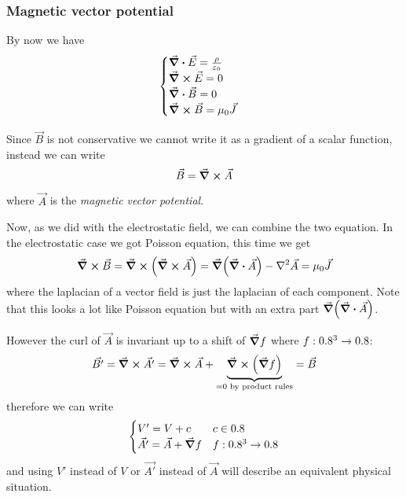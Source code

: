 \documentclass[12pt]{extarticle}
\begin{document}
\subsubsection{Magnetic vector potential}

By now we have
\begin{equation}
	\begin{cases}
		\div \vec E = \frac{\rho}{\varepsilon_0} \\
		\curl \vec E = 0                         \\
		\div \vec B = 0                          \\
		\curl \vec B = \mu_0 \vec J
	\end{cases}
\end{equation}

Since $\vec B$ is not conservative we cannot write it as a gradient of a scalar function,
instead we can write
\begin{equation}
	\vec B = \curl \vec A
\end{equation}
where $\vec A$ is the \emph{magnetic vector potential}.

Now, as we did with the electrostatic field, we can combine the two equation.
In the electrostatic case we got Poisson equation, this time we get
\begin{equation}
	\curl \vec B = \curl (\curl \vec A) = \grad(\div \vec A) - \laplacian{\vec A} = \mu_0 \vec J
\end{equation}
where the laplacian of a vector field is just the laplacian of each component.
Note that this looks a lot like Poisson equation but with an extra part $\grad(\div \vec A)$.

However the curl of $\vec A$ is invariant up to a shift of $\grad f$ where $f: 0.8^3 \to 0.8$:
\begin{equation}
	\vec {B'} = \curl \vec{A '} = \curl \vec A + \underbrace{\curl (\grad f)}_{= 0 \text{ by product rules}} = \vec B
\end{equation}
therefore we can write
\begin{equation}
	\begin{cases}
		V' = V + c                  & c \in 0.8        \\
		\vec{A'} = \vec A + \grad f & f : 0.8^3 \to 0.8
	\end{cases}
\end{equation}
and using $V'$ instead of $V$ or $\vec{A'}$ instead of $\vec A$ will describe an equivalent physical situation.
\end{document}
